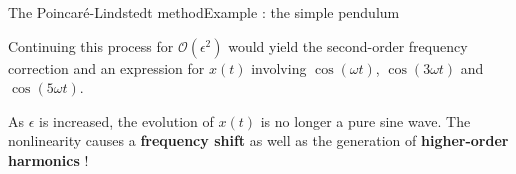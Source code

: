 \documentclass[usenames,dvipsnames,svgnames,10pt,aspectratio=169]{beamer}
\begin{document}
\begin{frame}[t, c]{The Poincaré-Lindstedt method}{Example : the simple pendulum}
  \begin{minipage}{.68\textwidth}
    Continuing this process for $\mathcal{O}(\epsilon^2)$ would yield the second-order frequency correction and an expression for $x(t)$ involving $\cos(\omega t)$, $\cos(3\omega t)$ and $\cos(5\omega t)$.

    \bigskip

    As $\epsilon$ is increased, the evolution of $x(t)$ is no longer a pure sine wave.
    The nonlinearity causes a \alert{\textbf{frequency shift}} as well as the generation of \alert{\textbf{higher-order harmonics}} !
  \end{minipage}%
  \hfill
  \begin{minipage}{.28\textwidth}
    \centering
  \end{minipage}

  \vspace{1cm}
\end{frame}
\end{document}
